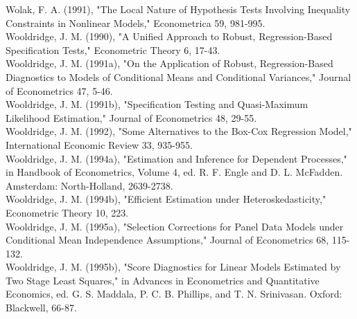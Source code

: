 \documentclass[10pt]{article}
\begin{document}
Wolak, F. A. (1991), "The Local Nature of Hypothesis Tests Involving Inequality Constraints in Nonlinear Models," Econometrica 59, 981-995.\\
Wooldridge, J. M. (1990), "A Unified Approach to Robust, Regression-Based Specification Tests," Econometric Theory 6, 17-43.\\
Wooldridge, J. M. (1991a), "On the Application of Robust, Regression-Based Diagnostics to Models of Conditional Means and Conditional Variances," Journal of Econometrics 47, 5-46.\\
Wooldridge, J. M. (1991b), "Specification Testing and Quasi-Maximum Likelihood Estimation," Journal of Econometrics 48, 29-55.\\
Wooldridge, J. M. (1992), "Some Alternatives to the Box-Cox Regression Model," International Economic Review 33, 935-955.\\
Wooldridge, J. M. (1994a), "Estimation and Inference for Dependent Processes," in Handbook of Econometrics, Volume 4, ed. R. F. Engle and D. L. McFadden. Amsterdam: North-Holland, 2639-2738.\\
Wooldridge, J. M. (1994b), "Efficient Estimation under Heteroskedasticity," Econometric Theory 10, 223.\\
Wooldridge, J. M. (1995a), "Selection Corrections for Panel Data Models under Conditional Mean Independence Assumptions," Journal of Econometrics 68, 115-132.\\
Wooldridge, J. M. (1995b), "Score Diagnostics for Linear Models Estimated by Two Stage Least Squares," in Advances in Econometrics and Quantitative Economics, ed. G. S. Maddala, P. C. B. Phillips, and T. N. Srinivasan. Oxford: Blackwell, 66-87.
\end{document}
